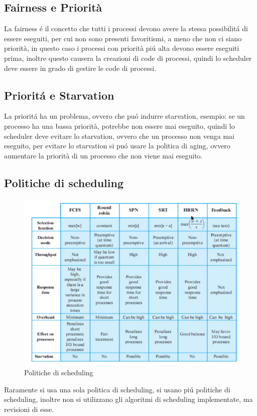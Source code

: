    \subsection{Fairness e Priorità}
    La fairness é il concetto che tutti i processi devono avere la stessa possibilitá di essere eseguiti, per cui non sono
    presenti favoritismi, a meno che non ci siano priorità, in questo caso i processi con priorità piú alta devono essere eseguiti
    prima, inoltre questo causera la creazioni di code di processi, quindi lo scheduler deve essere in grado di gestire le code
    di processi.
    \subsection{Prioritá e Starvation}
    La prioritá ha un problema, ovvero che puó indurre starvation, esempio: se un processo ha una bassa priorità, potrebbe
    non essere mai eseguito, quindi lo scheduler deve evitare lo starvation, ovvero che un processo non venga mai eseguito,
    per evitare lo starvation si puó usare la politica di aging, ovvero aumentare la priorità di un processo che non viene mai eseguito.
    \subsection{Politiche di scheduling}
    \begin{figure}[H]
        \centering
        \includegraphics[width=1\textwidth]{immagini/PoliticheDiScheduling}
        \caption{Politiche di scheduling}
    \end{figure}
    Raramente si usa una sola politica di scheduling, si usano piú politiche di scheduling, inoltre non si
    utilizzano gli algoritmi di scheduling implementate, ma revisioni di esse.
